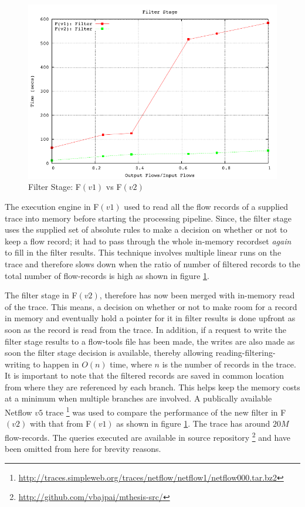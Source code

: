 \begin{figure}[h!]
  \begin{center}
    \includegraphics* [width=0.8\linewidth]{figures/benchmarks/filter-fv1-fv2}
    \caption{Filter Stage: F$(v1)$ vs F$(v2)$}
    \label{fig:fv1-fv2-filter}
  \end{center}
\end{figure}

The execution engine in F$(v1)$ used to read all the flow records of a
supplied trace into memory before starting the processing pipeline.  Since,
the filter stage uses the  supplied set of absolute rules to make a decision
on whether or not to keep a flow record; it had to pass through the whole
in-memory recordset \emph{again} to fill in the filter results. This technique
involves multiple linear runs on the trace and therefore slows down when the
ratio of number of filtered records to the total number of flow-records is
high as shown in figure \ref{fig:fv1-fv2-filter}.

The filter stage in F$(v2)$, therefore has now been merged with in-memory read
of the trace. This means, a decision on whether or not to make room for a
record in memory and eventually hold a pointer for it in filter results is
done upfront as soon as the record is read from the trace. In addition, if a
request to write the filter stage results to a flow-tools file has been made,
the writes are also made as soon the filter stage decision is available,
thereby    allowing reading-filtering-writing to
happen in $O(n)$ time, where $n$ is the number of records in the trace. It is
important to note that the filtered records are saved in common location from
where they are referenced by each branch. This helps keep the memory costs at
a minimum when multiple branches are involved. A publically available Netflow
$v5$ trace
\footnote{\url{http://traces.simpleweb.org/traces/netflow/netflow1/netflow000.tar.bz2}}
was used to compare the performance of the new filter in F$(v2)$ with that
from F$(v1)$ as shown in figure \ref{fig:fv1-fv2-filter}. The trace has around
$20M$ flow-records. The queries executed are available in source repository
\footnote{\url{http://github.com/vbajpai/mthesis-src/}} and have been omitted
from here for brevity reasons. 
